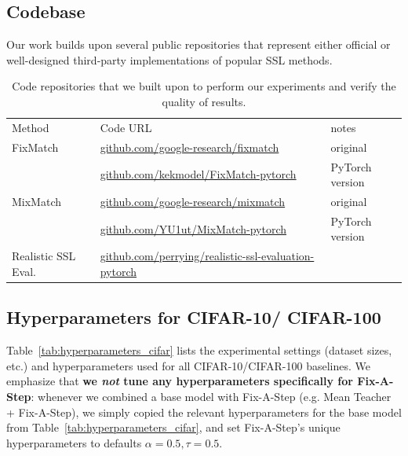 \subsection{Codebase}
Our work builds upon several public repositories that represent either official or well-designed third-party implementations of popular SSL methods.

\begin{table}[!h]
\begin{tabular}{l l l}
Method & Code URL & notes
\\
FixMatch & \url{github.com/google-research/fixmatch}
         & original
\\
         & \url{github.com/kekmodel/FixMatch-pytorch} & PyTorch version
\\
MixMatch & \url{github.com/google-research/mixmatch}
		 & original
\\
         & \url{github.com/YU1ut/MixMatch-pytorch} & PyTorch version
\\
Realistic SSL Eval. & \url{github.com/perrying/realistic-ssl-evaluation-pytorch}
\end{tabular}
\caption{Code repositories that we built upon to perform our experiments and verify the quality of results.}	
\end{table}

\subsection{Hyperparameters for CIFAR-10/ CIFAR-100}

Table~\ref{tab:hyperparameters_cifar} lists the experimental settings (dataset sizes, etc.) and hyperparameters used for all CIFAR-10/CIFAR-100 baselines.
We emphasize that \textbf{we \emph{not} tune any hyperparameters specifically for Fix-A-Step}: whenever we combined a base model with Fix-A-Step (e.g. Mean Teacher + Fix-A-Step), we simply copied the relevant hyperparameters for the base model from Table~\ref{tab:hyperparameters_cifar}, and set Fix-A-Step's unique hyperparameters to defaults $\alpha = 0.5, \tau=0.5$.


